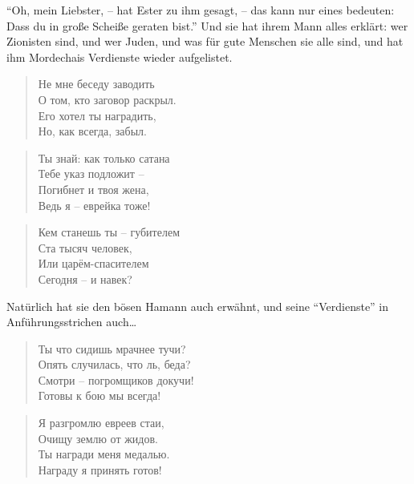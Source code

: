 \documentclass[12pt,a4paper,titlepage]{article}
\begin{document}
\begin{drama}
\uespeaks
"`Oh, mein Liebster, -- hat Ester zu ihm gesagt, -- das kann nur eines bedeuten:
Dass du in große Scheiße geraten bist."' Und sie hat ihrem Mann alles erklärt:
wer Zionisten sind, und wer Juden, und was für gute Menschen sie alle sind,
und hat ihm Mordechais Verdienste wieder aufgelistet.


\espeaks
\begin{verse}
Не мне беседу заводить\\
О том, кто заговор раскрыл.\\
Его хотел ты наградить,\\
Но, как всегда, забыл.\\
\end{verse}

\begin{verse}
Ты знай: как только сатана\\
Тебе указ подложит --\\
Погибнет и твоя жена,\\
Ведь я -- еврейка тоже!\\
\end{verse}

\begin{verse}
Кем станешь ты -- губителем\\
Ста тысяч человек,\\
Или царём-спасителем\\
Сегодня -- и навек?\\
\end{verse}


\uespeaks
Natürlich hat sie den bösen Hamann auch erwähnt, und seine
"`Verdienste"' in Anführungsstrichen auch\ldots



\scene


\amspeaks {}
\begin{verse}
Ты что сидишь мрачнее тучи?\\
Опять случилась, что ль, беда?\\
Смотри -- погромщиков докучи!\\
Готовы к бою мы всегда!\\
\end{verse}

\begin{verse}
Я разгромлю евреев стаи,\\
Очищу землю от жидов.\\
Ты награди меня медалью.\\
Награду я принять готов!\\
\end{verse}



\end{drama}
\end{document}
